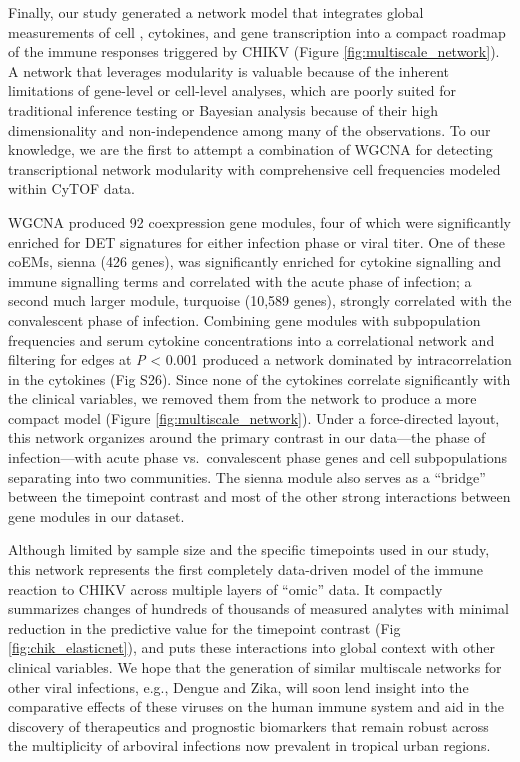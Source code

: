 Finally, our study generated a network model that integrates global measurements of cell \subcommunities{}, cytokines, and gene transcription into a compact roadmap of the immune responses triggered by CHIKV (Figure \ref{fig:multiscale_network}). A network that leverages modularity is valuable because of the inherent limitations of gene-level or cell-level analyses, which are poorly suited for traditional inference testing or Bayesian analysis because of their high dimensionality and non-independence among many of the observations. To our knowledge, we are the first to attempt a combination of WGCNA for detecting transcriptional network modularity with comprehensive cell \subcommunity{} frequencies modeled within CyTOF data. 

WGCNA produced 92 coexpression gene modules, four of which were significantly enriched for DET signatures for either infection phase or viral titer. One of these coEMs, sienna (426 genes), was significantly enriched for cytokine signalling and immune signalling terms and correlated with the acute phase of infection; a second much larger module, turquoise (10,589 genes), strongly correlated with the convalescent phase of infection. Combining gene modules with subpopulation frequencies and serum cytokine concentrations into a correlational network and filtering for edges at \emph{P} < 0.001 produced a network dominated by intracorrelation in the cytokines (Fig S26). Since none of the cytokines correlate significantly with the clinical variables, we removed them from the network to produce a more compact model (Figure \ref{fig:multiscale_network}). Under a force-directed layout, this network organizes around the primary contrast in our data—the phase of infection—with acute phase vs.\ convalescent phase genes and cell subpopulations separating into two communities. The sienna module also serves as a “bridge” between the timepoint contrast and most of the other strong interactions between gene modules in our dataset.

Although limited by sample size and the specific timepoints used in our study, this network represents the first completely data-driven model of the immune reaction to CHIKV across multiple layers of “omic” data. It compactly summarizes changes of hundreds of thousands of measured analytes with minimal reduction in the predictive value for the timepoint contrast (Fig \ref{fig:chik_elasticnet}), and puts these interactions into global context with other clinical variables. We hope that the generation of similar multiscale networks for other viral infections, e.g., Dengue and Zika, will soon lend insight into the comparative effects of these viruses on the human immune system and aid in the discovery of therapeutics and prognostic biomarkers that remain robust across the multiplicity of arboviral infections now prevalent in tropical urban regions.

